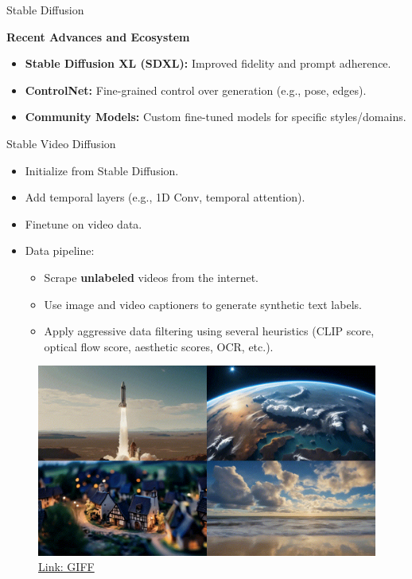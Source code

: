 \begin{frame}[allowframebreaks]{Stable Diffusion}
    \framebreak

    \textbf{Recent Advances and Ecosystem}
    \begin{itemize}
        \item \textbf{Stable Diffusion XL (SDXL):} Improved fidelity and prompt adherence.
        \item \textbf{ControlNet:} Fine-grained control over generation (e.g., pose, edges).
        \item \textbf{Community Models:} Custom fine-tuned models for specific styles/domains.
    \end{itemize}

\end{frame}

\begin{frame}[allowframebreaks]{Stable Video Diffusion}
    \begin{itemize}
        \item Initialize from Stable Diffusion.
        \item Add temporal layers (e.g., 1D Conv, temporal attention).
        \item Finetune on video data.
        \item Data pipeline:
        \begin{itemize}
            \item Scrape \textbf{unlabeled} videos from the internet.
            \item Use image and video captioners to generate synthetic text labels.
            \item Apply aggressive data filtering using several heuristics (CLIP score, optical flow score, aesthetic scores, OCR, etc.).
        \end{itemize}
    \end{itemize}
    
    \framebreak

    \begin{figure}
        \centering
        \includegraphics[width=1.06\linewidth,height=\textheight,keepaspectratio]{images/adv-img-gen/slide_101_1_img.png}
        \caption*{\href{https://drive.google.com/file/d/19XVG5MpxMRXP1hwHETkP_prlbHOcuTSj/view?usp=sharing}{Link: GIFF}}
    \end{figure}


\end{frame}
